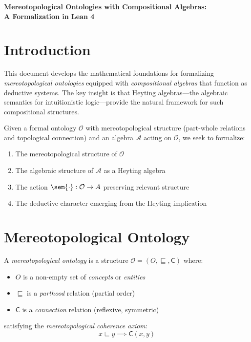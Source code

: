 \documentclass{itt-lean}
\begin{document}
\maketitle

\begin{center}
	\Large\textbf{Mereotopological Ontologies with Compositional Algebras:\\
	A Formalization in Lean 4}
\end{center}

\vspace{1em}

\section*{Introduction}

This document develops the mathematical foundations for formalizing \emph{mereotopological ontologies} equipped with \emph{compositional algebras} that function as deductive systems. The key insight is that Heyting algebras---the algebraic semantics for intuitionistic logic---provide the natural framework for such compositional structures.

Given a formal ontology $\mathcal{O}$ with mereotopological structure (part-whole relations and topological connection) and an algebra $\mathcal{A}$ acting on $\mathcal{O}$, we seek to formalize:
\begin{enumerate}
	\item The mereotopological structure of $\mathcal{O}$
	\item The algebraic structure of $\mathcal{A}$ as a Heyting algebra
	\item The action $\sem{\cdot} : \mathcal{O} \to A$ preserving relevant structure
	\item The deductive character emerging from the Heyting implication
\end{enumerate}

\section{Mereotopological Ontology}

\begin{definicao}
	A \emph{mereotopological ontology} is a structure $\mathcal{O} = (O, \sqsubseteq, \mathsf{C})$ where:
	\begin{itemize}
		\item $O$ is a non-empty set of \emph{concepts} or \emph{entities}
		\item $\sqsubseteq$ is a \emph{parthood} relation (partial order)
		\item $\mathsf{C}$ is a \emph{connection} relation (reflexive, symmetric)
	\end{itemize}
	satisfying the \emph{mereotopological coherence axiom}:
	$$
	x \sqsubseteq y \implies \mathsf{C}(x, y)
	$$
\end{definicao}
\end{document}
